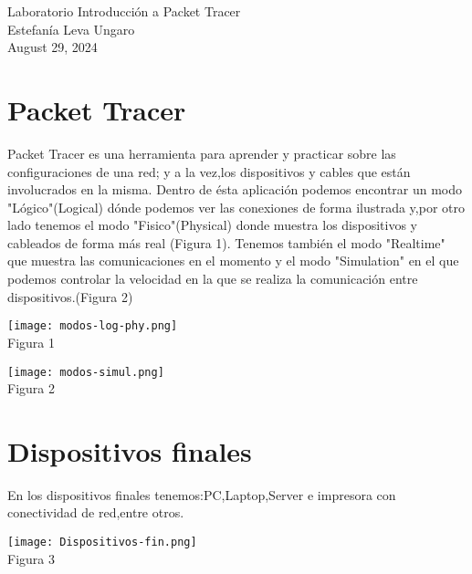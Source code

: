 \documentclass[]{article}
\begin{document}
\begin{center}
	Laboratorio Introducción a Packet Tracer \\
	Estefanía Leva Ungaro \\
	August 29, 2024
\end{center}



\section{Packet Tracer}
Packet Tracer es una herramienta para aprender y practicar sobre las configuraciones de una red; y a la vez,los dispositivos y cables que están involucrados en la misma. Dentro de ésta aplicación podemos encontrar un modo "Lógico"(Logical) dónde podemos ver las conexiones de forma ilustrada y,por otro lado tenemos el modo "Fisico"(Physical) donde muestra los dispositivos y cableados de forma más real (Figura 1). Tenemos también el modo "Realtime" que muestra las comunicaciones en el momento y el modo "Simulation" en el que podemos controlar la velocidad en la que se realiza la comunicación entre dispositivos.(Figura 2)
\begin{center}
	\texttt{[image: modos-log-phy.png]} \\  %
	Figura 1
\end{center}

\vspace{10pt}  %

\begin{center}
	\texttt{[image: modos-simul.png]} \\  %
	Figura 2
\end{center}
\section{Dispositivos finales}
En los dispositivos finales tenemos:PC,Laptop,Server e impresora con conectividad de red,entre otros.
\begin{center}
	\texttt{[image: Dispositivos-fin.png]} \\  %
	Figura 3
\end{center}
\end{document}
